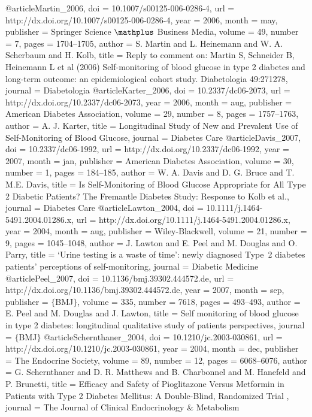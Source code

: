 @article{Martin_2006,
	doi = {10.1007/s00125-006-0286-4},
	url = {http://dx.doi.org/10.1007/s00125-006-0286-4},
	year = 2006,
	month = {may},
	publisher = {Springer Science $\mathplus$ Business Media},
	volume = {49},
	number = {7},
	pages = {1704--1705},
	author = {S. Martin and L. Heinemann and W. A. Scherbaum and H. Kolb},
	title = {Reply to comment on: Martin S, Schneider B, Heinemann L et al (2006) Self-monitoring of blood glucose in type 2 diabetes and long-term outcome: an epidemiological cohort study. Diabetologia 49:271{\textendash}278},
	journal = {Diabetologia}
}
@article{Karter_2006,
	doi = {10.2337/dc06-2073},
	url = {http://dx.doi.org/10.2337/dc06-2073},
	year = 2006,
	month = {aug},
	publisher = {American Diabetes Association},
	volume = {29},
	number = {8},
	pages = {1757--1763},
	author = {A. J. Karter},
	title = {Longitudinal Study of New and Prevalent Use of Self-Monitoring of Blood Glucose},
	journal = {Diabetes Care}
}
@article{Davis_2007,
	doi = {10.2337/dc06-1992},
	url = {http://dx.doi.org/10.2337/dc06-1992},
	year = 2007,
	month = {jan},
	publisher = {American Diabetes Association},
	volume = {30},
	number = {1},
	pages = {184--185},
	author = {W. A. Davis and D. G. Bruce and T. M.E. Davis},
	title = {Is Self-Monitoring of Blood Glucose Appropriate for All Type 2 Diabetic Patients? The Fremantle Diabetes Study: Response to Kolb et al.},
	journal = {Diabetes Care}
}
@article{Lawton_2004,
	doi = {10.1111/j.1464-5491.2004.01286.x},
	url = {http://dx.doi.org/10.1111/j.1464-5491.2004.01286.x},
	year = 2004,
	month = {aug},
	publisher = {Wiley-Blackwell},
	volume = {21},
	number = {9},
	pages = {1045--1048},
	author = {J. Lawton and E. Peel and M. Douglas and O. Parry},
	title = {`Urine testing is a waste of time': newly diagnosed Type~2 diabetes patients' perceptions of self-monitoring},
	journal = {Diabetic Medicine}
}
@article{Peel_2007,
	doi = {10.1136/bmj.39302.444572.de},
	url = {http://dx.doi.org/10.1136/bmj.39302.444572.de},
	year = 2007,
	month = {sep},
	publisher = {$\lbrace$BMJ$\rbrace$},
	volume = {335},
	number = {7618},
	pages = {493--493},
	author = {E. Peel and M. Douglas and J. Lawton},
	title = {Self monitoring of blood glucose in type 2 diabetes: longitudinal qualitative study of patients{\textquotesingle} perspectives},
	journal = {$\lbrace$BMJ$\rbrace$}
}
@article{Schernthaner_2004,
	doi = {10.1210/jc.2003-030861},
	url = {http://dx.doi.org/10.1210/jc.2003-030861},
	year = 2004,
	month = {dec},
	publisher = {The Endocrine Society},
	volume = {89},
	number = {12},
	pages = {6068--6076},
	author = {G. Schernthaner and D. R. Matthews and B. Charbonnel and M. Hanefeld and P. Brunetti},
	title = { Efficacy and Safety of Pioglitazone Versus Metformin in Patients with Type 2 Diabetes Mellitus: A Double-Blind, Randomized Trial },
	journal = {The Journal of Clinical Endocrinology {\&} Metabolism}
}

